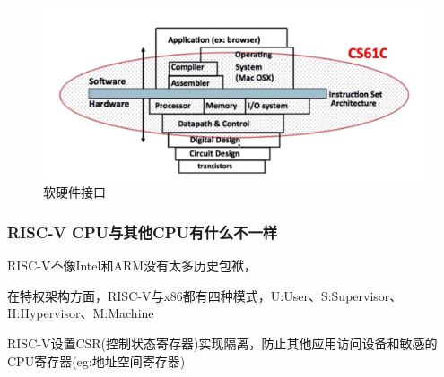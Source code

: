 \begin{figure}[htbp]
  \centering %
  \includegraphics[width=0.9 \textwidth]{figs/OS/软硬件接口.png}
  \caption{软硬件接口}
  \label{fig:软硬件接口} %
\end{figure}

\subsubsection{RISC-V CPU与其他CPU有什么不一样}
RISC-V不像Intel和ARM没有太多历史包袱，

在特权架构方面，RISC-V与x86都有四种模式，U:User、S:Supervisor、H:Hypervisor、M:Machine

RISC-V设置CSR(控制状态寄存器)实现隔离，防止其他应用访问设备和敏感的CPU寄存器(eg:地址空间寄存器)





